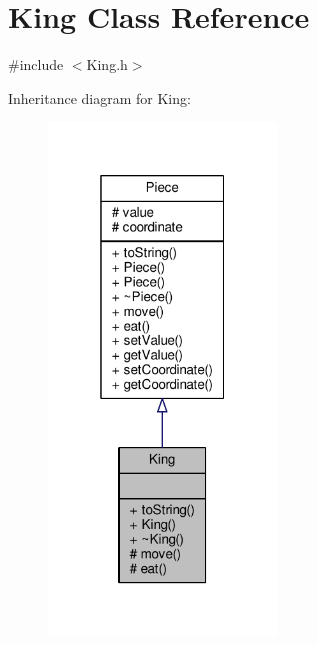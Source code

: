 \hypertarget{class_king}{}\section{King Class Reference}
\label{class_king}


{\ttfamily \#include $<$King.\+h$>$}



Inheritance diagram for King\+:
\nopagebreak
\begin{figure}[H]
\begin{center}
\leavevmode
\includegraphics[width=172pt]{class_king__inherit__graph}
\end{center}
\end{figure}


